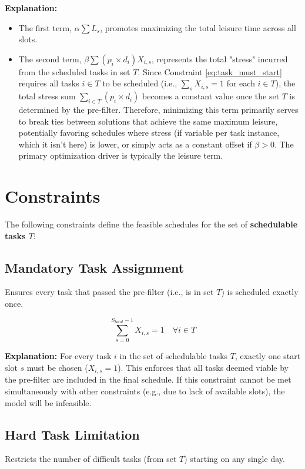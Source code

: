 \documentclass{article}
\begin{document}
\textbf{Explanation:}
\begin{itemize}
    \item The first term, $\alpha \sum L_s$, promotes maximizing the total leisure time across all slots.
    \item The second term, $\beta \sum (p_i \times d_i) X_{i,s}$, represents the total "stress" incurred from the scheduled tasks in set $T$. Since Constraint \ref{eq:task_must_start} requires all tasks $i \in T$ to be scheduled (i.e., $\sum_s X_{i,s} = 1$ for each $i \in T$), the total stress sum $\sum_{i \in T} (p_i \times d_i)$ becomes a constant value once the set $T$ is determined by the pre-filter. Therefore, minimizing this term primarily serves to break ties between solutions that achieve the same maximum leisure, potentially favoring schedules where stress (if variable per task instance, which it isn't here) is lower, or simply acts as a constant offset if $\beta > 0$. The primary optimization driver is typically the leisure term.
\end{itemize}

\section{Constraints}

The following constraints define the feasible schedules for the set of \textbf{schedulable tasks $T$}:

\subsection{Mandatory Task Assignment}
Ensures every task that passed the pre-filter (i.e., is in set $T$) is scheduled exactly once.

\begin{equation}
\sum_{s=0}^{S_{total}-1} X_{i,s} = 1 \quad \forall i \in T \label{eq:task_must_start}
\end{equation}

\textbf{Explanation:} For every task $i$ in the set of schedulable tasks $T$, exactly one start slot $s$ must be chosen ($X_{i,s}=1$). This enforces that all tasks deemed viable by the pre-filter are included in the final schedule. If this constraint cannot be met simultaneously with other constraints (e.g., due to lack of available slots), the model will be infeasible.

\subsection{Hard Task Limitation}
Restricts the number of difficult tasks (from set $T$) starting on any single day.
\end{document}
